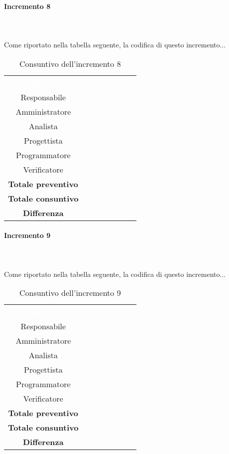 \paragraph*{Incremento 8} \mbox{} \\ \mbox{} \\
Come riportato nella tabella seguente, la codifica di questo incremento...
\begin{table}[H]
\centering\renewcommand{\arraystretch}{1.5}
\caption{Consuntivo dell'incremento 8}
\vspace{0.2cm}
\begin{tabular}{ c c c }
\rowcolor{redafk}
\textcolor{white}{\textbf{Ruolo}} & \textcolor{white}{\textbf{Ore}} &
\textcolor{white}{\textbf{Costo}}  \\
Responsabile 	&  &  \\
Amministratore 	&  	&  \\
Analista 		&   &  \\
Progettista		&   & \\
Programmatore	&  	& \\
Verificatore 	&  &  \\
\textbf{Totale preventivo} &  &   \\
\textbf{Totale consuntivo} &  &   \\
\rowcolor{lastrowcolor}
\textbf{Differenza} & &  \\
\end{tabular}
\end{table}

\paragraph*{Incremento 9} \mbox{} \\ \mbox{} \\
Come riportato nella tabella seguente, la codifica di questo incremento...
\begin{table}[H]
\centering\renewcommand{\arraystretch}{1.5}
\caption{Consuntivo dell'incremento 9}
\vspace{0.2cm}
\begin{tabular}{ c c c }
\rowcolor{redafk}
\textcolor{white}{\textbf{Ruolo}} & \textcolor{white}{\textbf{Ore}} &
\textcolor{white}{\textbf{Costo}}  \\
Responsabile 	&  &  \\
Amministratore 	&  	&  \\
Analista 		&   	&  \\
Progettista		&   	& \\
Programmatore	&  	& \\
Verificatore 	&  &  \\
\textbf{Totale preventivo} & &   \\
\textbf{Totale consuntivo} &  &   \\
\rowcolor{lastrowcolor}
\textbf{Differenza} & &  \\
\end{tabular}
\end{table}

